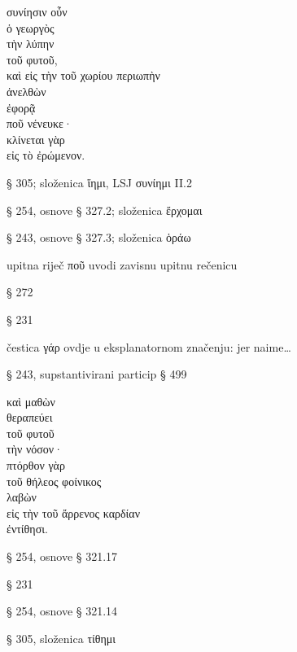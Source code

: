 
{\large
\begin{greek}
\noindent συνίησιν οὖν \\
ὁ γεωργὸς \\
τὴν λύπην \\
\tabto{2em} τοῦ φυτοῦ, \\
καὶ εἰς τὴν τοῦ χωρίου περιωπὴν \\
ἀνελθὼν \\
ἐφορᾷ \\
\tabto{2em} ποῦ νένευκε· \\
κλίνεται γὰρ \\
\tabto{2em} εἰς τὸ ἐρώμενον.\\

\end{greek}
}

\begin{description}[noitemsep]
\item[συνίησιν] § 305; složenica ἵημι, LSJ συνίημι II.2
\item[ἀνελθὼν] § 254, osnove § 327.2; složenica ἔρχομαι
\item[ἐφορᾷ] § 243, osnove § 327.3; složenica ὁράω
\item[ποῦ νένευκε] upitna riječ ποῦ uvodi zavisnu upitnu rečenicu
\item[νένευκε] § 272
\item[κλίνεται] § 231
\item[γὰρ] čestica γάρ ovdje u eksplanatornom značenju: jer naime\dots
\item[τὸ ἐρώμενον] § 243, supstantivirani particip § 499
\end{description}


{\large
\begin{greek}
\noindent καὶ μαθὼν \\
θεραπεύει \\
\tabto{2em} τοῦ φυτοῦ \\
τὴν νόσον· \\
πτόρθον γὰρ \\
\tabto{2em} τοῦ θήλεος φοίνικος \\
λαβὼν \\
\tabto{2em} εἰς τὴν τοῦ ἄρρενος καρδίαν \\
ἐντίθησι.\\

\end{greek}
}

\begin{description}[noitemsep]
\item[μαθὼν] § 254, osnove § 321.17
\item[θεραπεύει] § 231
\item[λαβὼν] § 254, osnove § 321.14
\item[ἐντίθησι] § 305, složenica τίθημι

\end{description}

